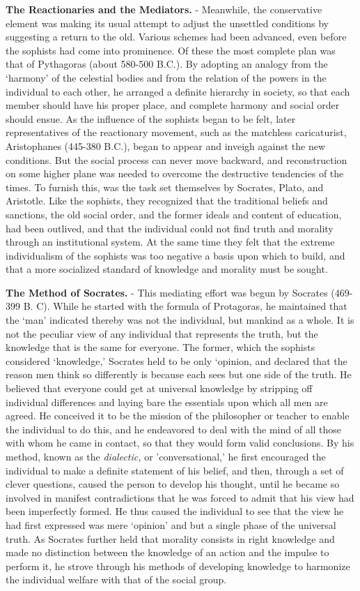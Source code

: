 \documentclass[]{book}
\begin{document}
\textbf{The Reactionaries and the Mediators.} - Meanwhile, the conservative element was making its usual attempt to adjust the unsettled conditions by suggesting a return to the old. Various schemes had been advanced, even before the sophists had come into prominence. Of these the most complete plan was that of Pythagoras (about 580-500 B.C.). By adopting an analogy from the `harmony' of the celestial bodies and from the relation of the powers in the individual to each other, he arranged a definite hierarchy in society, so that each member should have his proper place, and complete harmony and social order should ensue. As the influence of the sophists began to be felt, later representatives of the reactionary movement, such as the matchless caricaturist, Aristophanes (445-380 B.C.), began to appear and inveigh against the new conditions. But the social process can never move backward, and reconstruction on some higher plane was needed to overcome the destructive tendencies of the times. To furnish this, was the task set themselves by Socrates, Plato, and Aristotle. Like the sophists, they recognized that the traditional beliefs and sanctions, the old social order, and the former ideals and content of education, had been outlived, and that the individual could not find truth and morality through an institutional system. At the same time they felt that the extreme individualism of the sophists was too negative a basis upon which to build, and that a more socialized standard of knowledge and morality must be sought.

\textbf{The Method of Socrates.} - This mediating effort was begun by Socrates (469-399 B. C). While he started with the formula of Protagoras, he maintained that the `man' indicated thereby was not the individual, but mankind as a whole. It is not the peculiar view of any individual that represents the truth, but the knowledge that is the same for everyone. The former, which the sophists considered `knowledge,' Socrates held to be only `opinion, and declared that the reason men think so differently is because each sees but one side of the truth. He believed that everyone could get at universal knowledge by stripping off individual differences and laying bare the essentials upon which all men are agreed. He conceived it to be the mission of the philosopher or teacher to enable the individual to do this, and he endeavored to deal with the mind of all those with whom he came in contact, so that they would form valid conclusions. By his method, known as the \emph{dialectic,} or 'conversational,' he first encouraged the individual to make a definite statement of his belief, and then, through a set of clever questions, caused the person to develop his thought, until he became so involved in manifest contradictions that he was forced to admit that his view had been imperfectly formed. He thus caused the individual to see that the view he had first expressed was mere `opinion' and but a single phase of the universal truth. As Socrates further held that morality consists in right knowledge and made no distinction between the knowledge of an action and the impulse to perform it, he strove through his methods of developing knowledge to harmonize the individual welfare with that of the social group.
\end{document}
